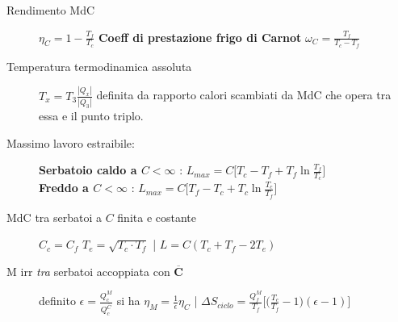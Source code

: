 \documentclass[10pt, oneside]{article}
\begin{document}
\begin{description}
\item[Rendimento MdC] $\boxed{\displaystyle \eta_C = 1 - \frac{T_f}{T_c}}$ \hfill \textbf{Coeff di prestazione frigo di Carnot} $\boxed{\displaystyle \omega_C = \frac{T_f}{T_c - T_f}}$
\item[Temperatura termodinamica assoluta] $\displaystyle T_x = T_3 \frac{|Q_x|}{|Q_3|}$ definita da rapporto calori scambiati da MdC che opera tra essa e il punto triplo.
\item[Massimo lavoro estraibile:] \textbf{Serbatoio caldo a $C < \infty$} : $\displaystyle L_{max} = C\bigg[T_c - T_f + T_f \ln \frac{T_f}{T_c}\bigg]$ \\ \textbf{Freddo a $C < \infty$} : $\displaystyle L_{max} = C \bigg[T_f - T_c + T_c \ln \frac{T_c}{T_f}\bigg]$
\item[MdC tra serbatoi a $C$ finita e costante] $\displaystyle C_c = C_f$ \hfill \big\rangle \hfill $\displaystyle T_e = \sqrt{T_c \cdot T_f}$ \hfill \big| \hfill $\displaystyle L = C (T_c + T_f - 2 T_e)$
\item[M irr \textit{tra} serbatoi accoppiata con $\mathbf{\overline{C}}$] definito $\displaystyle \epsilon = \frac{\displaystyle Q_c^M}{\displaystyle Q_c^{\overline{C}}}$ si ha $\displaystyle \eta_M = \frac{1}{\epsilon} \eta_C$ \hfill \big| \hfill $\displaystyle \Delta S_{ciclo} = \frac{Q_f^M}{T_f} \bigg[\bigg(\frac{T_c}{T_f} - 1\bigg)(\epsilon - 1)\bigg]$
\end{description}
\end{document}
